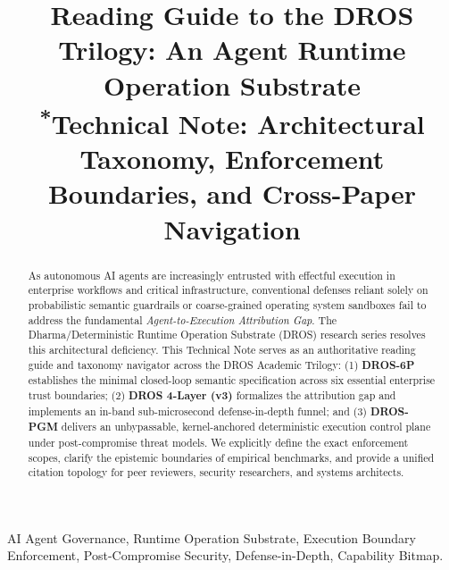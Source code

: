 \documentclass[conference]{IEEEtran}
\begin{document}
\title{Reading Guide to the DROS Trilogy: An Agent Runtime Operation Substrate\\
{\footnotesize \textsuperscript{*}Technical Note: Architectural Taxonomy, Enforcement Boundaries, and Cross-Paper Navigation}}

\author{
}

\maketitle
\thispagestyle{plain}
\pagestyle{plain}

\begin{abstract}
As autonomous AI agents are increasingly entrusted with effectful execution in enterprise workflows and critical infrastructure, conventional defenses reliant solely on probabilistic semantic guardrails or coarse-grained operating system sandboxes fail to address the fundamental \textit{Agent-to-Execution Attribution Gap}. The Dharma/Deterministic Runtime Operation Substrate (DROS) research series resolves this architectural deficiency. This Technical Note serves as an authoritative reading guide and taxonomy navigator across the DROS Academic Trilogy: (1) \textbf{DROS-6P} establishes the minimal closed-loop semantic specification across six essential enterprise trust boundaries; (2) \textbf{DROS 4-Layer (v3)} formalizes the attribution gap and implements an in-band sub-microsecond defense-in-depth funnel; and (3) \textbf{DROS-PGM} delivers an unbypassable, kernel-anchored deterministic execution control plane under post-compromise threat models. We explicitly define the exact enforcement scopes, clarify the epistemic boundaries of empirical benchmarks, and provide a unified citation topology for peer reviewers, security researchers, and systems architects.
\end{abstract}

\begin{IEEEkeywords}
AI Agent Governance, Runtime Operation Substrate, Execution Boundary Enforcement, Post-Compromise Security, Defense-in-Depth, Capability Bitmap.
\end{IEEEkeywords}
\end{document}
